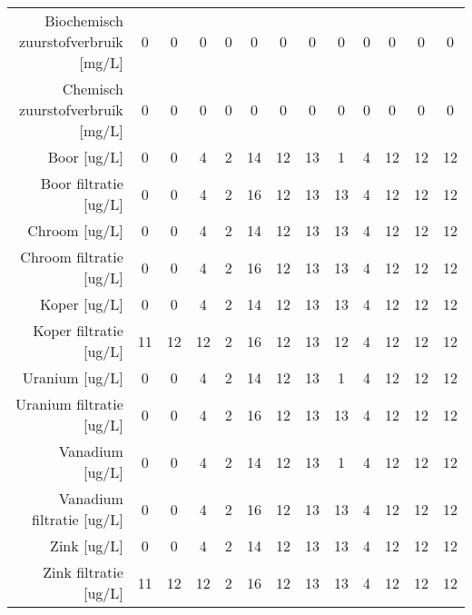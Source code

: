\begin{tabular}{ r |c | c | c | c | c |c | c | c | c | c | c | c }
Biochemisch zuurstofverbruik [mg/L] &0 & 0 & 0 & 0 & 0 & 0 & 0 & 0 & 0 & 0 & 0 & 0 \\
Chemisch zuurstofverbruik [mg/L] &0 & 0 & 0 & 0 & 0 & 0 & 0 & 0 & 0 & 0 & 0 & 0 \\
Boor [ug/L] &0 & 0 & 4 & 2 & 14 & 12 & 13 & 1 & 4 & 12 & 12 & 12 \\
Boor filtratie [ug/L] &0 & 0 & 4 & 2 & 16 & 12 & 13 & 13 & 4 & 12 & 12 & 12 \\
Chroom [ug/L] &0 & 0 & 4 & 2 & 14 & 12 & 13 & 13 & 4 & 12 & 12 & 12 \\
Chroom filtratie [ug/L] &0 & 0 & 4 & 2 & 16 & 12 & 13 & 13 & 4 & 12 & 12 & 12 \\
Koper [ug/L] &0 & 0 & 4 & 2 & 14 & 12 & 13 & 13 & 4 & 12 & 12 & 12 \\
Koper filtratie [ug/L] &11 & 12 & 12 & 2 & 16 & 12 & 13 & 12 & 4 & 12 & 12 & 12 \\
Uranium [ug/L] &0 & 0 & 4 & 2 & 14 & 12 & 13 & 1 & 4 & 12 & 12 & 12 \\
Uranium filtratie [ug/L] &0 & 0 & 4 & 2 & 16 & 12 & 13 & 13 & 4 & 12 & 12 & 12 \\
Vanadium [ug/L] &0 & 0 & 4 & 2 & 14 & 12 & 13 & 1 & 4 & 12 & 12 & 12 \\
Vanadium filtratie [ug/L] &0 & 0 & 4 & 2 & 16 & 12 & 13 & 13 & 4 & 12 & 12 & 12 \\
Zink [ug/L] &0 & 0 & 4 & 2 & 14 & 12 & 13 & 13 & 4 & 12 & 12 & 12 \\
Zink filtratie [ug/L] &11 & 12 & 12 & 2 & 16 & 12 & 13 & 13 & 4 & 12 & 12 & 12 \\
\end{tabular}    
